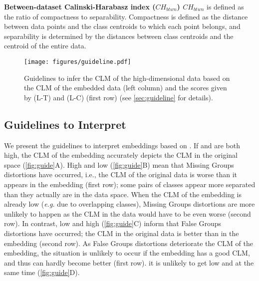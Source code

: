 \noindent
\textbf{Between-dataset Calinski-Harabasz index ($CH_{btwn}$) \cite{jeon22arxiv2}}
$CH_{btwn}$ is defined as the ratio of compactness to separability. Compactness is defined as the distance between data points and the class centroids to which each point belongs, and separability is determined by the distances between class centroids and the centroid of the entire data. 



\begin{figure}[t]
    \centering
    \texttt{[image: figures/guideline.pdf]}
    \vspace{-6mm}
    \caption{Guidelines to infer the CLM of the high-dimensional data based on the CLM of the embedded data (left column) and the scores given by \lt (L-T) and \lc (L-C) (first row) (see \autoref{sec:guideline} for details).
    }
    \vspace{-3mm}
    \label{fig:guide}
\end{figure}





\subsection{Guidelines to Interpret \ltc}

\label{sec:guideline}

We present the guidelines to interpret embeddings based on \ltc.
If \lt and \lc are both high,  the CLM of the embedding accurately depicts the CLM in the original space (\autoref{fig:guide}A). 
High \lt and low \lc (\autoref{fig:guide}B) mean that Missing Groups distortions have occurred, i.e., the CLM of the original data is worse than it appears in the embedding (first row); some pairs of classes appear more separated than they actually are in the data space. 
When the CLM of the embedding is already low (\textit{e.g.} due to overlapping classes), Missing Groups distortions are more unlikely to happen as the CLM in the data would have to be even worse (second row).
In contrast, low \lt and high \lc (\autoref{fig:guide}C) inform that False Groups distortions have occurred; the CLM in the original data is better than in the embedding (second row).
As False Groups distortions deteriorate the CLM of the embedding, the situation is unlikely to occur if the embedding has a good CLM, and thus can hardly become better (first row).
it is unlikely to get low \lt and \lc at the same time (\autoref{fig:guide}D). 


